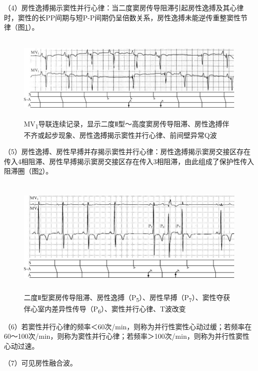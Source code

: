 （4）房性逸搏揭示窦性并行心律：当二度窦房传导阻滞引起房性逸搏及其心律时，窦性的长PP间期与短P-P间期仍呈倍数关系，房性逸搏未能逆传重整窦性节律（图\ref{fig16-4}）。

\begin{figure}[!htbp]
 \centering
 \includegraphics[width=5.78125in,height=1.63542in]{./images/Image00280.jpg}
 \captionsetup{justification=centering}
 \caption{MV\textsubscript{1}导联连续记录，显示二度Ⅱ型～高度窦房传导阻滞、房性逸搏伴不齐或起步现象、房性逸搏揭示窦性并行心律、前间壁异常Q波}
 \label{fig16-4}
  \end{figure} 


（5）房性逸搏、房性早搏并存揭示窦性并行心律：房性逸搏揭示窦房交接区存在传入4相阻滞、房性早搏揭示窦房交接区存在传入3相阻滞，由此组成了保护性传入阻滞圈（图\ref{fig16-5}）。

\begin{figure}[!htbp]
 \centering
 \includegraphics[width=5.73958in,height=2.26042in]{./images/Image00281.jpg}
 \captionsetup{justification=centering}
 \caption{二度Ⅱ型窦房传导阻滞、房性逸搏（P\textsubscript{5}）、房性早搏（P\textsubscript{7}）、窦性夺获伴心室内差异性传导（P\textsubscript{6}）、窦性并行心律、T波改变}
 \label{fig16-5}
  \end{figure} 


（6）若窦性并行心律的频率＜60次/min，则称为并行性窦性心动过缓；若频率在60～100次/min，则称为窦性并行心律；若频率＞100次/min，则称为并行性窦性心动过速。

（7）可见房性融合波。

\protect\hypertarget{text00023.htmlux5cux23subid285}{}{}

